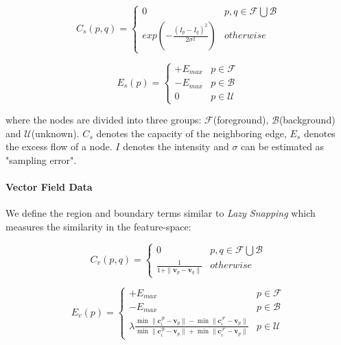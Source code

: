 \begin{equation}
\label{equation bk_capacity}
C_{s}(p,q) = \left\{
    \begin{array}{ll}
    0 & p, q \in \mathcal{F} \bigcup \mathcal{B}\\
    exp(-\frac{(I_p - I_q)^2}{2\sigma^2}) & otherwise
    \end{array}
\right.
\end{equation}

\begin{equation}
\label{equation bk_excessflow}
E_{s}(p) = \left\{
    \begin{array}{ll}
    +E_{max} & p \in \mathcal{F}\\
    -E_{max} & p \in \mathcal{B}\\
    0 & p \in \mathcal{U}
    \end{array}
\right.
\end{equation}

where the nodes are divided into three groups: $\mathcal{F}$(foreground), $\mathcal{B}$(background) and $\mathcal{U}$(unknown).
$C_s$ denotes the capacity of the neighboring edge, $E_s$ denotes the excess flow of a node.
$I$ denotes the intensity and $\sigma$ can be estimated as "sampling error".

\paragraph*{\textbf{Vector Field Data}} We define the region and boundary terms similar to \textit{Lazy Snapping} which measures the similarity in the feature-space:

\begin{equation}
\label{equation lazy capacity}
C_{v}(p,q) = \left\{
    \begin{array}{ll}
    0 & p, q \in \mathcal{F} \bigcup \mathcal{B}\\
    \frac{1}{1 + \| \mathbf{v}_p - \mathbf{v}_q \|} & otherwise
    \end{array}
\right.
\end{equation}

\begin{equation}
\label{equation lazy excessflow}
E_{v}(p) = \left\{
    \begin{array}{ll}
    +E_{max} & p \in \mathcal{F}\\
    -E_{max} & p \in \mathcal{B}\\
    \lambda \frac{\min{\|\mathbf{c}_i^\mathcal{B}-\mathbf{v}_p \|} - \min{\|\mathbf{c}_i^\mathcal{F}-\mathbf{v}_p \|}}{\min{\|\mathbf{c}_i^\mathcal{B}-\mathbf{v}_p \|} + \min{\|\mathbf{c}_i^\mathcal{F}-\mathbf{v}_p \|}} & p \in \mathcal{U}
    \end{array}
\right.
\end{equation}


